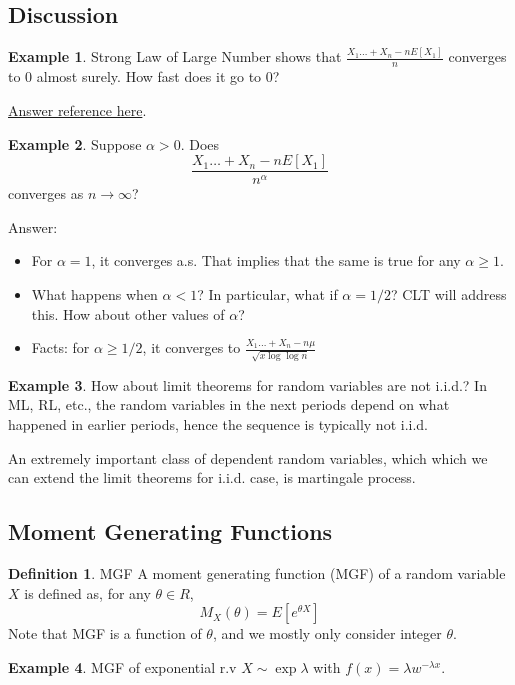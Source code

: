 \documentclass[11pt]{article}
\newenvironment{answer}{\par\begingroup\color{gre}Answer: }{\endgroup}
\theoremstyle{definition}
\newtheorem{definition}{Definition}[section]
\newtheorem{example}{Example}[subsection]
\theoremstyle{remark}
\begin{document}
\subsection{Discussion} 
    \begin{example}
    Strong Law of Large Number shows that $\frac{X_1 \dots + X_n - n E[X_1]}{n}$ converges to 0 almost surely. How fast does it go to 0?
    \end{example} 
    \href{https://zlearning.netlify.app/math/probability/strong-law-of-large-numbers.html}{Answer reference here}. 

    \begin{example}
        Suppose $\alpha > 0$. Does $$\frac{X_1 \dots + X_n - n E[X_1]}{n^\alpha}$$ converges as $n \rightarrow \infty$?
    \end{example} 
    \begin{answer}
        \begin{itemize}
        \item For $\alpha = 1$, it converges a.s. That implies that the same is true for any $\alpha \geq 1$.
        \item What happens when $\alpha < 1$? In particular, what if $\alpha = 1/2$? CLT will address this. How about other values of $\alpha$?
        \item Facts: for $\alpha \geq 1/2$, it converges to $\frac{X_1 \dots + X_n - n \mu}{\sqrt{x \log \log n}}$
        \end{itemize}
    \end{answer}

    \begin{example}
        How about limit theorems for random variables are not i.i.d.? In ML, RL, etc., the random variables in the next periods depend on what happened in earlier periods, hence the sequence is typically not i.i.d.

        An extremely important class of dependent random variables, which which we can extend the limit theorems for i.i.d. case, is martingale process.
    \end{example} 
    

\subsection{Moment Generating Functions}
    \begin{definition}{MGF}
        A moment generating function (MGF) of a random variable $X$ is defined as, for any $\theta \in R$,
        $$M_X(\theta) = E[e^{\theta X}]$$
        Note that MGF is a function of $\theta$, and we mostly only consider integer $\theta$.
    \end{definition}
    \begin{example}
        MGF of exponential r.v $X \sim \exp{\lambda}$ with $f(x) =\lambda w^{-\lambda x}$.
    \end{example} 
\end{document}

